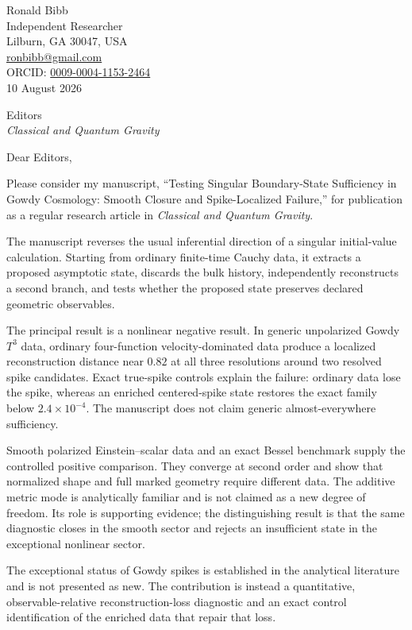 \documentclass[11pt]{article}
\begin{document}
\begin{flushright}
Ronald Bibb\\
Independent Researcher\\
Lilburn, GA 30047, USA\\
\href{mailto:ronbibb@gmail.com}{ronbibb@gmail.com}\\
ORCID: \href{https://orcid.org/0009-0004-1153-2464}{0009-0004-1153-2464}\\[7pt]
10 August 2026
\end{flushright}

Editors\\
\textit{Classical and Quantum Gravity}

\vspace{7pt}

Dear Editors,

Please consider my manuscript, ``Testing Singular Boundary-State Sufficiency
in Gowdy Cosmology: Smooth Closure and Spike-Localized Failure,'' for publication as a regular
research article in \textit{Classical and Quantum Gravity}.

The manuscript reverses the usual inferential direction of a singular
initial-value calculation. Starting from ordinary finite-time Cauchy data, it
extracts a proposed asymptotic state, discards the bulk history, independently
reconstructs a second branch, and tests whether the proposed state preserves
declared geometric observables.

The principal result is a nonlinear negative result. In generic unpolarized Gowdy
$T^3$ data, ordinary four-function velocity-dominated data produce a localized
reconstruction distance near $0.82$ at all three resolutions around two
resolved spike candidates. Exact true-spike controls explain the failure:
ordinary data lose the spike, whereas an enriched centered-spike state restores
the exact family below $2.4\times10^{-4}$. The manuscript does not claim generic
almost-everywhere sufficiency.

Smooth polarized Einstein--scalar data and an exact Bessel benchmark supply
the controlled positive comparison. They converge at second order and show
that normalized shape and full marked geometry require different data. The
additive metric mode is analytically familiar and is not claimed as a new
degree of freedom. Its role is supporting evidence; the distinguishing result
is that the same diagnostic closes in the smooth sector and rejects an
insufficient state in the exceptional nonlinear sector.

The exceptional status of Gowdy spikes is established in the analytical
literature and is not presented as new. The contribution is instead a
quantitative, observable-relative reconstruction-loss diagnostic and an exact
control identification of the enriched data that repair that loss.
\end{document}

